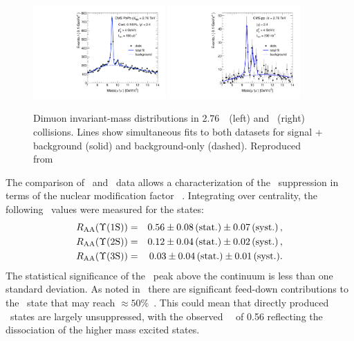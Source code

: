 \begin{figure}[t]
\begin{center}
    \includegraphics[width=0.45\textwidth]{qqbarfigures/hiFitPt4Erf}
    \includegraphics[width=0.45\textwidth]{qqbarfigures/ppFitPt4Erf}
    \caption{Dimuon invariant-mass distributions in 2.76\TeV\ \PbPb\ (left) and \pp\ (right)
collisions.  Lines show simultaneous fits to both
datasets for signal + background (solid) and background-only (dashed).
Reproduced from~\cite{Chatrchyan:2012lxa}}
\label{fig:GR:mass}
\end{center}
\end{figure}

The comparison of \pp\ and \PbPb\ data allows a characterization of the \PgU\ suppression
in terms of the nuclear modification factor \Raa~\cite{Chatrchyan:2012lxa}.
Integrating over centrality, the following \Raa\ values were measured for the \PgUn states:
\begin{eqnarray}
R_\mathrm{AA} (\Upsilon\mathrm{(1S)}) &=& 0.56 \pm 0.08\,\mbox{(stat.)} \pm 0.07\,\mbox{(syst.)} \,, \\
R_\mathrm{AA} (\Upsilon\mathrm{(2S)}) &=& 0.12 \pm 0.04\,\mbox{(stat.)} \pm 0.02\,\mbox{(syst.)} \,, \nonumber \\
R_\mathrm{AA} (\Upsilon\mathrm{(3S)}) &=& 0.03 \pm 0.04\,\mbox{(stat.)} \pm 0.01\,\mbox{(syst.)} .  \nonumber
\end{eqnarray}
The statistical significance of the \PgUc\ peak above the continuum is less than one standard deviation.
As noted in~\cite{Chatrchyan:2012lxa} there are significant feed-down contributions to
the \PgUa\ state that may reach $\approx 50\%$~\cite{Affolder:1999wm, Aaij:2012se}.
This could mean that directly produced \PgUa\ states are largely unsuppressed, with
the observed \PgUa\ \Raa\ of 0.56 reflecting the dissociation of the higher
mass excited states.

